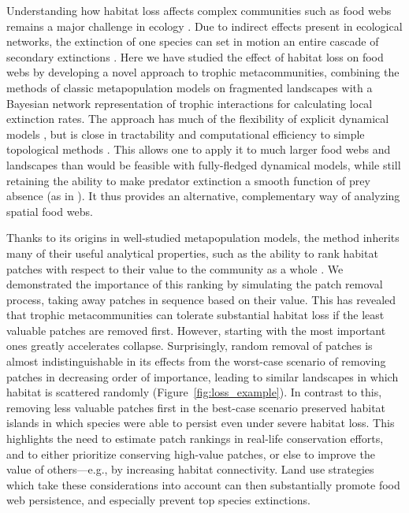 \documentclass[11pt]{article}
\begin{document}
Understanding how habitat loss affects complex communities such as food webs remains a major challenge in ecology \citep{Guzman2018, LeiboldChase2018}. Due to indirect effects present in ecological networks, the extinction of one species can set in motion an entire cascade of secondary extinctions \citep{EbenmanJonsson2005, Dunne2009}. Here we have studied the effect of habitat loss on food webs by developing a novel approach to trophic metacommunities, combining the methods of classic metapopulation models on fragmented landscapes \citep{HanskiOvaskainen2000, HanskiOvaskainen2003, OvaskainenHanski2001, Grillietal2015} with a Bayesian network representation of trophic interactions \citep{Eklofetal2013MEE} for calculating local extinction rates. The approach has much of the flexibility of explicit dynamical models \citep{Ryser2019}, but is close in tractability and computational efficiency to simple topological methods \citep{Dunne2009}. This allows one to apply it to much larger food webs and landscapes than would be feasible with fully-fledged dynamical models, while still retaining the ability to make predator extinction a smooth function of prey absence (as in \citealp{Cazellesetal2015}). It thus provides an alternative, complementary way of analyzing spatial food webs.

Thanks to its origins in well-studied metapopulation models, the method inherits many of their useful analytical properties, such as the ability to rank habitat patches with respect to their value to the community as a whole \citep{OvaskainenHanski2001}. We demonstrated the importance of this ranking by simulating the patch removal process, taking away patches in sequence based on their value. This has revealed that trophic metacommunities can tolerate substantial habitat loss if the least valuable patches are removed first. However, starting with the most important ones greatly accelerates collapse. Surprisingly, random removal of patches is almost indistinguishable in its effects from the worst-case scenario of removing patches in decreasing order of importance, leading to similar landscapes in which habitat is scattered randomly (Figure~\ref{fig:loss_example}). In contrast to this, removing less valuable patches first in the best-case scenario preserved habitat islands in which species were able to persist even under severe habitat loss. This highlights the need to estimate patch rankings in real-life conservation efforts, and to either prioritize conserving high-value patches, or else to improve the value of others---e.g., by increasing habitat connectivity. Land use strategies which take these considerations into account can then substantially promote food web persistence, and especially prevent top species extinctions.
\end{document}
